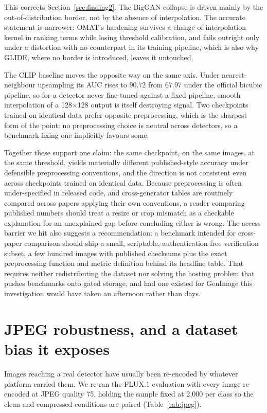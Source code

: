 \documentclass[3p,times,procedia]{elsarticle}
\begin{document}
This corrects Section~\ref{sec:finding2}. The BigGAN collapse is driven
mainly by the out-of-distribution border, not by the absence of
interpolation. The accurate statement is narrower: OMAT's hardening
survives a change of interpolation kernel in ranking terms while losing
threshold calibration, and fails outright only under a distortion with no
counterpart in its training pipeline, which is also why GLIDE, where no
border is introduced, leaves it untouched.

The CLIP baseline moves the opposite way on the same axis. Under
nearest-neighbour upsampling its AUC rises to 90.72 from 67.97 under the
official bicubic pipeline, so for a detector never fine-tuned against a
fixed pipeline, smooth interpolation of a 128$\times$128 output is itself
destroying signal. Two checkpoints trained on identical data prefer
opposite preprocessing, which is the sharpest form of the point: no
preprocessing choice is neutral across detectors, so a benchmark fixing one
implicitly favours some.

Together these support one claim: the same checkpoint, on the same images,
at the same threshold, yields materially different published-style accuracy
under defensible preprocessing conventions, and the direction is not
consistent even across checkpoints trained on identical data. Because
preprocessing is often under-specified in released code, and cross-generator
tables are routinely compared across papers applying their own conventions,
a reader comparing published numbers should treat a resize or crop mismatch
as a checkable explanation for an unexplained gap before concluding either
is wrong. The access barrier we hit also suggests a recommendation: a
benchmark intended for cross-paper comparison should ship a small,
scriptable, authentication-free verification subset, a few hundred images
with published checksums plus the exact preprocessing function and metric
definition behind its headline table. That requires neither redistributing
the dataset nor solving the hosting problem that pushes benchmarks onto
gated storage, and had one existed for GenImage this investigation would
have taken an afternoon rather than days.

\section{JPEG robustness, and a dataset bias it exposes}
\label{sec:robustness}

Images reaching a real detector have usually been re-encoded by whatever
platform carried them. We re-ran the FLUX.1 evaluation with every image
re-encoded at JPEG quality 75, holding the sample fixed at 2{,}000 per
class so the clean and compressed conditions are paired
(Table~\ref{tab:jpeg}).
\end{document}
